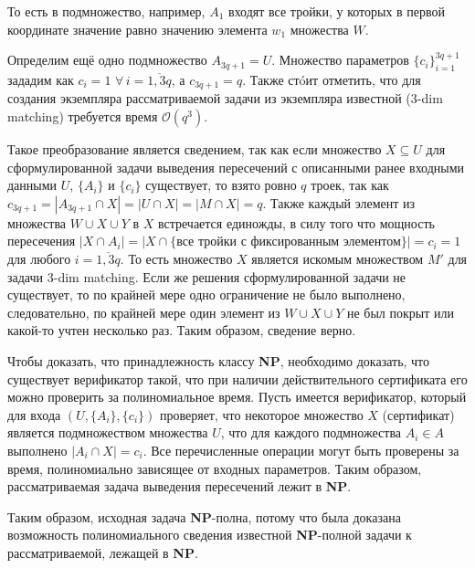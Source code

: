 \documentclass[10pt]{article}
\begin{document}
\par То есть в подмножество, например, $A_1$ входят все тройки, у которых в первой координате значение равно значению элемента $w_1$ множества $W$. 
\medskip\par
Определим ещё одно подмножество $A_{3q+1}=U$. Множество параметров $\{c_i\}_{i=1}^{3q+1}$ зададим как $c_i=1$ $\forall\,i=\overline{1, 3q}$, а $c_{3q+1}=q$.
Также ст\'{o}ит отметить, что для создания экземпляра рассматриваемой задачи из экземпляра известной (3-dim matching) требуется время $\mathcal{O}(q^3)$.
\medskip\par 
Такое преобразование является сведением, так как если множество $X\subseteq U$ для сформулированной задачи выведения пересечений с описанными ранее входными данными $U$, $\{A_i\}$ и $\{c_i\}$ существует, то взято ровно $q$ троек, так как $c_{3q+1}=|A_{3q+1}\cap X|= |U\cap X| = |M \cap X| = q$. Также каждый элемент из множества $W\cup X\cup Y$ в $X$ встречается единожды, в силу того что мощность пересечения $|X \cap A_i| = |X \cap \{\text{все тройки с фиксированным элементом}\}| = c_i = 1$ для любого $i=\overline{1,3q}$. То есть множество $X$ является искомым множеством $M'$ для задачи 3-dim matching. Если же решения сформулированной задачи не существует, то по крайней мере одно ограничение не было выполнено, следовательно, по крайней мере один элемент из $W\cup X\cup Y$ не был покрыт или какой-то учтен несколько раз. Таким образом, сведение верно.
\medskip\par 
Чтобы доказать, что принадлежность классу \textbf{NP}, необходимо доказать, что существует
верификатор такой, что при наличии действительного сертификата его можно проверить
за полиномиальное время. Пусть имеется верификатор, который для входа $(U, \{A_i\},\{c_i\})$ проверяет, что некоторое множество $X$ (сертификат) является подмножеством множества $U$, что для каждого подмножества $A_i \in A$ выполнено $|A_i\cap X| = c_i$. Все перечисленные операции могут быть проверены за время, полиномиально зависящее от входных параметров. Таким образом, рассматриваемая задача выведения пересечений лежит в \textbf{NP}.
\medskip\par 
Таким образом, исходная задача \textbf{NP}-полна, потому что была доказана возможность полиномиального сведения известной \textbf{NP}-полной задачи к рассматриваемой, лежащей в \textbf{NP}. 
\ \\[0.2 cm]
\hline
\end{document}
